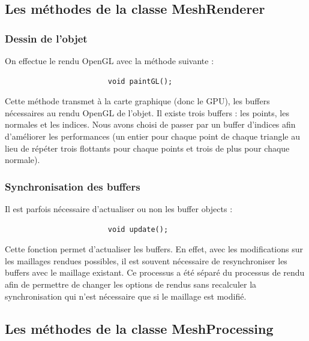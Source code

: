 \documentclass[a4paper]{memoir}
\begin{document}
			\subsection{Les méthodes de la classe MeshRenderer}
				\label{renderer-dev}
				\subsubsection{Dessin de l'objet}
					On effectue le rendu OpenGL avec la méthode suivante :
					\begin{verbatim}
						void paintGL();
					\end{verbatim}
					Cette méthode transmet à la carte graphique (donc le GPU), les buffers nécessaires au rendu OpenGL de l'objet. Il existe trois buffers : 
					les points, les normales et les indices. Nous avons choisi de passer par un buffer d'indices afin d'améliorer les performances (un 
					entier pour chaque point de chaque triangle au lieu de répéter trois flottants pour chaque points et trois de plus pour chaque normale).
					
				\subsubsection{Synchronisation des buffers}
					Il est parfois nécessaire d'actualiser ou non les buffer objects :
					\begin{verbatim}
						void update();
					\end{verbatim}
					Cette fonction permet d'actualiser les buffers. En effet, avec les modifications sur les maillages rendues possibles, il est souvent 
					nécessaire de resynchroniser les buffers avec le maillage existant. Ce processus a été séparé du processus de rendu afin de permettre de 
					changer les options de rendus sans recalculer la synchronisation qui n'est nécessaire que si le maillage est modifié.
				
			\subsection{Les méthodes de la classe MeshProcessing}
				\label{processing-dev}
\end{document}
